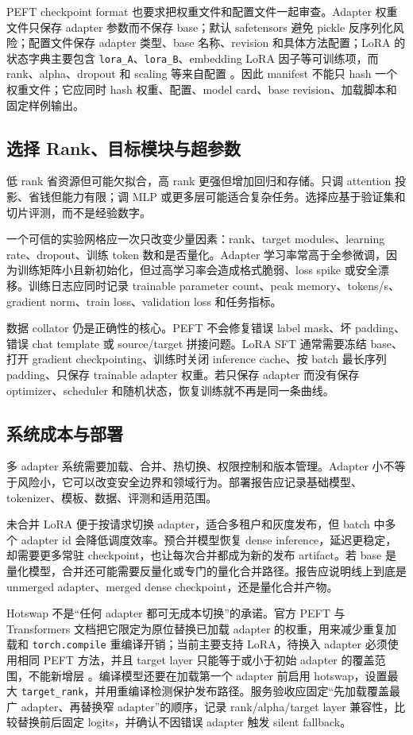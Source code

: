 \documentclass[UTF8,zihao=-4,openany]{ctexbook}
\begin{document}
PEFT checkpoint format 也要求把权重文件和配置文件一起审查。Adapter 权重文件只保存 adapter 参数而不保存 base；默认 safetensors 避免 pickle 反序列化风险；配置文件保存 adapter 类型、base 名称、revision 和具体方法配置；LoRA 的状态字典主要包含 \texttt{lora\_A}、\texttt{lora\_B}、embedding LoRA 因子等可训练项，而 rank、alpha、dropout 和 scaling 等来自配置 \cite{huggingface2026peftcheckpoint}。因此 manifest 不能只 hash 一个权重文件；它应同时 hash 权重、配置、model card、base revision、加载脚本和固定样例输出。

\subsection{选择 Rank、目标模块与超参数}
低 rank 省资源但可能欠拟合，高 rank 更强但增加回归和存储。只调 attention 投影、省钱但能力有限；调 MLP 或更多层可能适合复杂任务。选择应基于验证集和切片评测，而不是经验数字。

一个可信的实验网格应一次只改变少量因素：rank、target modules、learning rate、dropout、训练 token 数和是否量化。Adapter 学习率常高于全参微调，因为训练矩阵小且新初始化，但过高学习率会造成格式脆弱、loss spike 或安全漂移。训练日志应同时记录 trainable parameter count、peak memory、tokens/s、gradient norm、train loss、validation loss 和任务指标。

数据 collator 仍是正确性的核心。PEFT 不会修复错误 label mask、坏 padding、错误 chat template 或 source/target 拼接问题。LoRA SFT 通常需要冻结 base、打开 gradient checkpointing、训练时关闭 inference cache、按 batch 最长序列 padding、只保存 trainable adapter 权重。若只保存 adapter 而没有保存 optimizer、scheduler 和随机状态，恢复训练就不再是同一条曲线。

\subsection{系统成本与部署}
多 adapter 系统需要加载、合并、热切换、权限控制和版本管理。Adapter 小不等于风险小，它可以改变安全边界和领域行为。部署报告应记录基础模型、tokenizer、模板、数据、评测和适用范围。

未合并 LoRA 便于按请求切换 adapter，适合多租户和灰度发布，但 batch 中多个 adapter id 会降低调度效率。预合并模型恢复 dense inference，延迟更稳定，却需要更多常驻 checkpoint，也让每次合并都成为新的发布 artifact。若 base 是量化模型，合并还可能需要反量化或专门的量化合并路径。报告应说明线上到底是 unmerged adapter、merged dense checkpoint，还是量化合并产物。

Hotswap 不是“任何 adapter 都可无成本切换”的承诺。官方 PEFT 与 Transformers 文档把它限定为原位替换已加载 adapter 的权重，用来减少重复加载和 \texttt{torch.compile} 重编译开销；当前主要支持 LoRA，待换入 adapter 必须使用相同 PEFT 方法，并且 target layer 只能等于或小于初始 adapter 的覆盖范围，不能新增层 \cite{huggingface2026pefthotswap,huggingface2026transformerspeft}。编译模型还要在加载第一个 adapter 前启用 hotswap，设置最大 \texttt{target\_rank}，并用重编译检测保护发布路径。服务验收应固定“先加载覆盖最广 adapter、再替换窄 adapter”的顺序，记录 rank/alpha/target layer 兼容性，比较替换前后固定 logits，并确认不因错误 adapter 触发 silent fallback。
\end{document}
